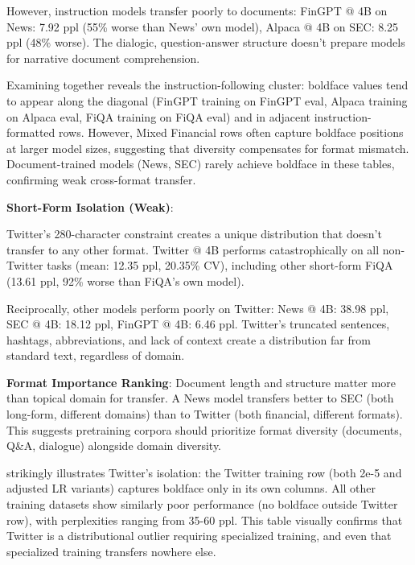 However, instruction models transfer poorly to documents: FinGPT @ 4B on News: 7.92 ppl (55\% worse than News' own model), Alpaca @ 4B on SEC: 8.25 ppl (48\% worse). The dialogic, question-answer structure doesn't prepare models for narrative document comprehension.







Examining  together reveals the instruction-following cluster: boldface values tend to appear along the diagonal (FinGPT training on FinGPT eval, Alpaca training on Alpaca eval, FiQA training on FiQA eval) and in adjacent instruction-formatted rows. However, Mixed Financial rows often capture boldface positions at larger model sizes, suggesting that diversity compensates for format mismatch. Document-trained models (News, SEC) rarely achieve boldface in these tables, confirming weak cross-format transfer.

\textbf{Short-Form Isolation (Weak)}:

Twitter's 280-character constraint creates a unique distribution that doesn't transfer to any other format. Twitter @ 4B performs catastrophically on all non-Twitter tasks (mean: 12.35 ppl, 20.35\% CV), including other short-form FiQA (13.61 ppl, 92\% worse than FiQA's own model).

Reciprocally, other models perform poorly on Twitter: News @ 4B: 38.98 ppl, SEC @ 4B: 18.12 ppl, FinGPT @ 4B: 6.46 ppl. Twitter's truncated sentences, hashtags, abbreviations, and lack of context create a distribution far from standard text, regardless of domain.

\textbf{Format Importance Ranking}: Document length and structure matter more than topical domain for transfer. A News model transfers better to SEC (both long-form, different domains) than to Twitter (both financial, different formats). This suggests pretraining corpora should prioritize format diversity (documents, Q\&A, dialogue) alongside domain diversity.



 strikingly illustrates Twitter's isolation: the Twitter training row (both 2e-5 and adjusted LR variants) captures boldface only in its own columns. All other training datasets show similarly poor performance (no boldface outside Twitter row), with perplexities ranging from 35-60 ppl. This table visually confirms that Twitter is a distributional outlier requiring specialized training, and even that specialized training transfers nowhere else.

